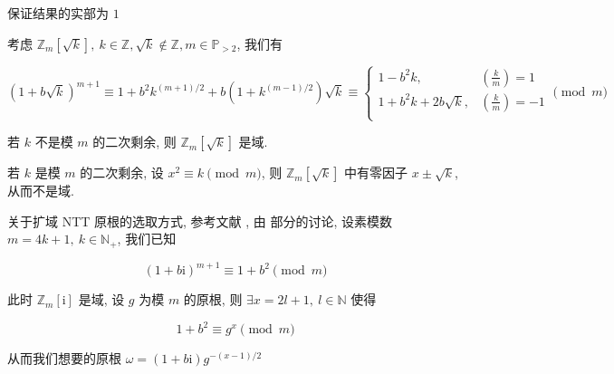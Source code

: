 保证结果的实部为 \(1\)

考虑 \(\mathbb{Z}_m\left[\sqrt{k}\right],~k\in\mathbb{Z},\sqrt{k}\notin \mathbb{Z},m\in\mathbb{P}_{>2}\), 我们有

\[
    \left(1+b\sqrt{k}\right)^{m+1}\equiv 1+b^2 k^{(m+1)/2} + b\left(1+k^{(m-1)/2}\right)\sqrt{k} \equiv\begin{cases}
        1-b^2 k,              & \left(\frac{k}{m}\right)=1  \\
        1+b^2 k + 2b\sqrt{k}, & \left(\frac{k}{m}\right)=-1 \\
    \end{cases} \pmod m
\]

若 \(k\) 不是模 \(m\) 的二次剩余, 则 \(\mathbb{Z}_m\left[\sqrt{k}\right]\) 是域.

若 \(k\) 是模 \(m\) 的二次剩余, 设 \(x^2\equiv k\pmod m\), 则 \(\mathbb{Z}_m\left[\sqrt{k}\right]\) 中有零因子 \(x\pm\sqrt{k}\), 从而不是域.

关于扩域 NTT 原根的选取方式, 参考文献 \cite{ieee1451721}, 由  部分的讨论, 设素模数 \(m=4k+1,~k\in\mathbb{N}_+\), 我们已知

\[
    \left(1+b\mathrm{i}\right)^{m+1}\equiv 1+b^2\pmod m
\]

此时 \(\mathbb{Z}_m\left[\mathrm{i}\right]\) 是域, 设 \(g\) 为模 \(m\) 的原根, 则 \(\exists x=2l+1,~l\in\mathbb{N}\) 使得

\[
    1+b^2\equiv g^x\pmod m
\]

从而我们想要的原根 \(\omega=\left(1+b\mathrm{i}\right)g^{-(x-1)/2}\)
